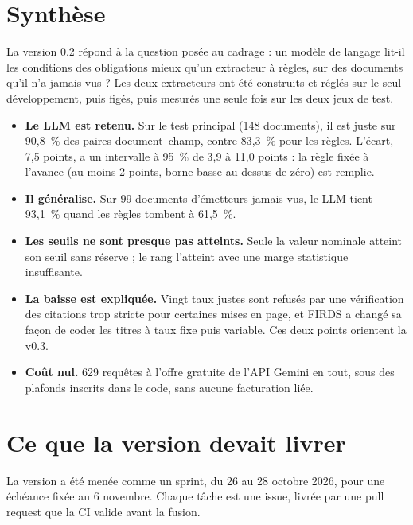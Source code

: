 \documentclass[11pt,a4paper]{article}
\begin{document}

\setcounter{tocdepth}{1}
\tableofcontents
\newpage

\section*{Synthèse}

La version 0.2 répond à la question posée au cadrage : un modèle de langage lit-il les conditions des obligations mieux qu'un extracteur à règles, sur des documents qu'il n'a jamais vus ? Les deux extracteurs ont été construits et réglés sur le seul développement, puis figés, puis mesurés une seule fois sur les deux jeux de test.

\begin{itemize}
  \item \textbf{Le LLM est retenu.} Sur le test principal (148 documents), il est juste sur 90,8~\% des paires document--champ, contre 83,3~\% pour les règles. L'écart, 7,5 points, a un intervalle à 95~\% de 3,9 à 11,0 points : la règle fixée à l'avance (au moins 2 points, borne basse au-dessus de zéro) est remplie.
  \item \textbf{Il généralise.} Sur 99 documents d'émetteurs jamais vus, le LLM tient 93,1~\% quand les règles tombent à 61,5~\%.
  \item \textbf{Les seuils ne sont presque pas atteints.} Seule la valeur nominale atteint son seuil sans réserve ; le rang l'atteint avec une marge statistique insuffisante.
  \item \textbf{La baisse est expliquée.} Vingt taux justes sont refusés par une vérification des citations trop stricte pour certaines mises en page, et FIRDS a changé sa façon de coder les titres à taux fixe puis variable. Ces deux points orientent la v0.3.
  \item \textbf{Coût nul.} 629 requêtes à l'offre gratuite de l'API Gemini en tout, sous des plafonds inscrits dans le code, sans aucune facturation liée.
\end{itemize}

\section{Ce que la version devait livrer}

La version a été menée comme un sprint, du 26 au 28 octobre 2026, pour une échéance fixée au 6 novembre. Chaque tâche est une issue, livrée par une pull request que la CI valide avant la fusion.
\end{document}
